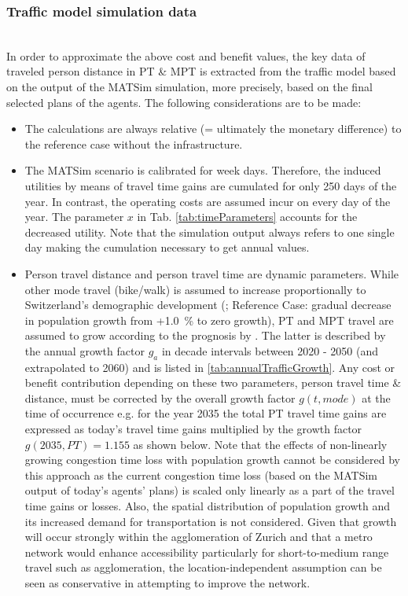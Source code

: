 \subsubsection{Traffic model simulation data}\label{subsub:simData}\mbox{}\\
 
\vspace{-5ex} In order to approximate the above cost and benefit values, the key data of traveled person distance in PT \& MPT is extracted from the traffic model based on the output of the MATSim simulation, more precisely, based on the final selected plans of the agents. The following considerations are to be made:
\begin{itemize}
	\item The calculations are always relative (= ultimately the monetary difference) to the reference case without the infrastructure.
	\item The MATSim scenario is calibrated for week days. Therefore, the induced utilities by means of travel time gains are cumulated for only 250 days of the year. In contrast, the operating costs are assumed incur on every day of the year. The parameter $x$ in Tab. \ref{tab:timeParameters} accounts for the decreased utility. Note that the simulation output always refers to one single day making the cumulation necessary to get annual values.
	\item Person travel distance and person travel time are dynamic parameters. While other mode travel (bike/walk) is assumed to increase proportionally to Switzerland's demographic development (\cite{BfsPopGrowth2015X}; Reference Case: gradual decrease in population growth from +1.0~\% to zero growth), PT and MPT travel are assumed to grow according to the prognosis by \cite{ARE2016}. The latter is described by the annual growth factor $g_a$ in decade intervals between 2020 - 2050 (and extrapolated to 2060) and is listed in \ref{tab:annualTrafficGrowth}. Any cost or benefit contribution depending on these two parameters, person travel time \& distance, must be corrected by the overall growth factor $g(t,mode)$ at the time of occurrence e.g. for the year 2035 the total PT travel time gains are expressed as today's travel time gains multiplied by the growth factor $g(2035, PT) =1.155$ as shown below. Note that the effects of non-linearly growing congestion time loss with population growth cannot be considered by this approach as the current congestion time loss (based on the MATSim output of today's agents' plans) is scaled only linearly as a part of the travel time gains or losses. Also, the spatial distribution of population growth and its increased demand for transportation is not considered. Given that growth will occur strongly within the agglomeration of Zurich and that a metro network would enhance accessibility particularly for short-to-medium range travel such as agglomeration, the location-independent assumption can be seen as conservative in attempting to improve the network.
	

\end{itemize}
